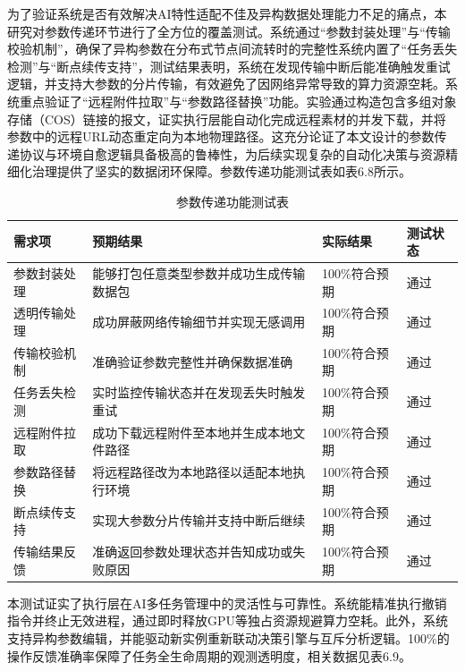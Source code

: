 为了验证系统是否有效解决AI特性适配不佳及异构数据处理能力不足的痛点，本研究对参数传递环节进行了全方位的覆盖测试。系统通过“参数封装处理”与“传输校验机制”，确保了异构参数在分布式节点间流转时的完整性系统内置了“任务丢失检测”与“断点续传支持”，测试结果表明，系统在发现传输中断后能准确触发重试逻辑，并支持大参数的分片传输，有效避免了因网络异常导致的算力资源空耗。系统重点验证了“远程附件拉取”与“参数路径替换”功能。实验通过构造包含多组对象存储（COS）链接的报文，证实执行层能自动化完成远程素材的并发下载，并将参数中的远程URL动态重定向为本地物理路径。这充分论证了本文设计的参数传递协议与环境自愈逻辑具备极高的鲁棒性，为后续实现复杂的自动化决策与资源精细化治理提供了坚实的数据闭环保障。参数传递功能测试表如表6.8所示。

\begin{table}[htbp]
\centering
\caption{参数传递功能测试表}
\begin{tabularx}{\textwidth}{lXll}
\toprule
\textbf{需求项} & \textbf{预期结果} & \textbf{实际结果} & \textbf{测试状态} \\
\midrule
参数封装处理 & 能够打包任意类型参数并成功生成传输数据包  & 100\%符合预期 & 通过 \\
透明传输处理 & 成功屏蔽网络传输细节并实现无感调用  & 100\%符合预期 & 通过 \\
传输校验机制 & 准确验证参数完整性并确保数据准确  & 100\%符合预期 & 通过 \\
任务丢失检测 & 实时监控传输状态并在发现丢失时触发重试  & 100\%符合预期 & 通过 \\
远程附件拉取 & 成功下载远程附件至本地并生成本地文件路径  & 100\%符合预期 & 通过 \\
参数路径替换 & 将远程路径改为本地路径以适配本地执行环境  & 100\%符合预期 & 通过 \\
断点续传支持 & 实现大参数分片传输并支持中断后继续  & 100\%符合预期 & 通过 \\
传输结果反馈 & 准确返回参数处理状态并告知成功或失败原因  & 100\%符合预期 & 通过 \\
\bottomrule
\end{tabularx}
\end{table}

本测试证实了执行层在AI多任务管理中的灵活性与可靠性。系统能精准执行撤销指令并终止无效进程，通过即时释放GPU等独占资源规避算力空耗。此外，系统支持异构参数编辑，并能驱动新实例重新联动决策引擎与互斥分析逻辑。100\%的操作反馈准确率保障了任务全生命周期的观测透明度，相关数据见表6.9。

